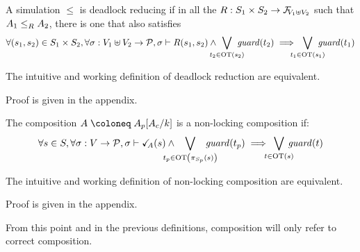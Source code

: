 \documentclass{article}
\begin{document}
\begin{defi}
A simulation \(\leq\) is deadlock reducing if in all the \(R: S_1 \times S_2 \to \rformulae[V_1 \uplus V_2]\) such that \(\wrel{A_1}{A_2}{R}\), there is one that also satisfies
\[ \forall \mpar{s_1, s_2} \in S_1 \times S_2, \forall \sigma: V_1 \uplus V_2 \to \values, \sigma \vdash R\mpar{s_1, s_2} \wedge \bigvee_\subbox{t_2 \in \fOT{s_2}} \fguard{t_2} \implies \bigvee_\subbox{t_1 \in \fOT{s_1}} \fguard{t_1} \]
\end{defi}
\begin{lem}
The intuitive and working definition of deadlock reduction are equivalent.
\end{lem}
Proof is given in the appendix. %

\begin{defi}
The composition \(A \defobject A_p\subst{A_c}{k}\) is a non-locking composition if:
\[ \forall s \in S, \forall \sigma: V \to \values, \sigma \vdash \reach{A}\mpar{s} \wedge \bigvee_\subbox{t_p \in \fOT{\pi_{S_p}\mpar{s}}} \fguard{t_p} \implies \bigvee_\subbox{t \in \fOT{s}} \fguard{t} \]
\end{defi}
\begin{lem}
The intuitive and working definition of non-locking composition are equivalent.
\end{lem}
Proof is given in the appendix. %


From this point and in the previous definitions, composition will only refer to correct composition.

\end{document}
